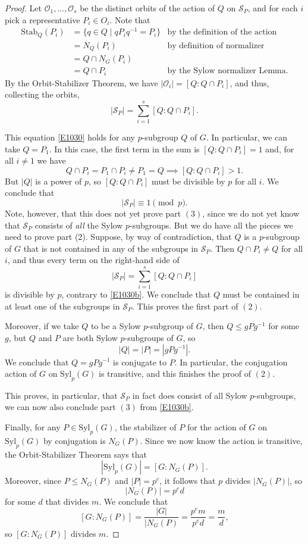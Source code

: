 \documentclass[12pt]{report}
\numberwithin{equation}{section}
\numberwithin{theorem}{chapter}
\theoremstyle{definition}
\newtheorem*{basic properties}{Basic Properties}
\newtheorem*{Important Remark}{Important Remark}
\newcommand{\cS}{\mathcal{S}}
\begin{document}
\begin{proof}
Let $\mathcal{O}_1, \dots, \mathcal{O}_s$ be the distinct orbits of the action of $Q$ on $\cS_P$, and for each $i$ pick a representative $P_i \in O_i$. Note that 
$$\begin{aligned}
\mathrm{Stab}_Q(P_i) & = \{q \in Q \mid qP_iq^{-1} = P_i\} & \textrm{by the definition of the action}\\
& = N_Q(P_i) & \textrm{by definition of normalizer}\\
& = Q \cap N_G(P_i) &  \\
& = Q \cap P_i & \text{by the Sylow normalizer Lemma}.	
\end{aligned}$$ 
By the Orbit-Stabilizer Theorem, we have $|\mathcal{O}_i| = [Q: Q \cap P_i]$, and thus, collecting the orbits,
\begin{equation} \label{E1030}
|\cS_P |= \sum_{i=1}^s [Q: Q \cap P_i].
\end{equation}

This equation \ref{E1030} holds for any $p$-subgroup $Q$ of $G$. In particular, we can take $Q = P_1$. In this case, the first term in the sum is $[Q: Q \cap P_i] = 1$ and, for all $i \neq 1$ we have
$$Q \cap P_i = P_1 \cap P_i \neq P_1 = Q \implies [Q: Q \cap P_i] > 1.$$ 
But $|Q|$ is a power of $p$, so $[Q: Q \cap P_i]$ must be divisible by $p$ for all $i$. We conclude that
\begin{equation} \label{E1030b}
|\cS_P| \equiv 1 \pmod{p}.
\end{equation}
Note, however, that this does not yet prove part $(3)$, since we do not yet know that $\cS_P$ consists of \emph{all} the Sylow $p$-subgroups.
But we do have all the pieces we need to prove part (2). Suppose, by way of contradiction, that $Q$ is a $p$-subgroup of $G$ that is not contained in any of the subgroups in $\cS_P$. Then $Q \cap P_i \neq Q$ for all $i$, and thus every term on the right-hand side of 
$$|\cS_P |= \sum_{i=1}^s [Q: Q \cap P_i]$$
is divisible by $p$, contrary to \eqref{E1030b}. We conclude that $Q$ must be contained in at least one of the subgroups in $\cS_P$. This proves the first part of $(2)$. 

Moreover, if we take $Q$ to be a Sylow $p$-subgroup of $G$, then $Q \leq gPg^{-1}$ for some $g$, but $Q$ and $P$ are both Sylow $p$-subgroups of $G$, so
$$|Q| = |P| = |gPg^{-1}|.$$
We conclude that $Q = gPg^{-1}$ is conjugate to $P$. In particular, the conjugation action of $G$ on $\mathrm{Syl}_p(G)$ is transitive, and this finishes the proof of $(2)$.


This proves, in particular, that $\cS_P$ in fact does consist of all Sylow $p$-subgroups, we can now also conclude part $(3)$ from \eqref{E1030b}.

Finally, for any $P \in \mathrm{Syl}_p(G)$, the stabilizer of $P$ for the action of $G$ on $\mathrm{Syl}_p(G)$ by conjugation is $N_G(P)$. Since we now know the action is transitive, the Orbit-Stabilizer Theorem says that
$$|\mathrm{Syl}_p(G)| = [G: N_G(P)].$$
Moreover, since $P \leq N_G(P)$ and $|P| = p^e$, it follows that $p$ divides $|N_G(P)|$, so
$$|N_G(P)| = p^e d$$
for some $d$ that divides $m$. We conclude that
$$[G: N_G(P)] = \frac{|G|}{|N_G(P)} = \frac{p^em}{p^ed} = \frac{m}{d},$$
so $[G: N_G(P)]$ divides $m$.
\end{proof}
\end{document}
